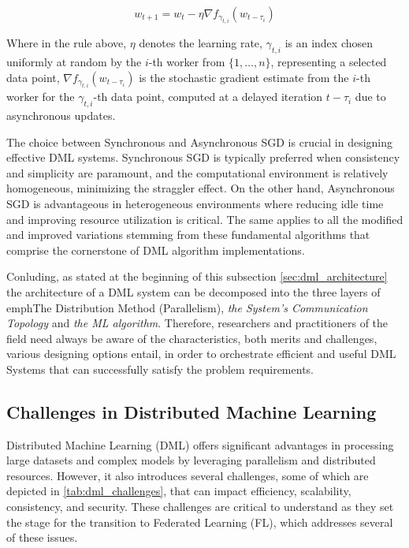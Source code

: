 \begin{equation}
    \label{eq:asgd}
    w_{t+1} = w_t - \eta \nabla f_{\gamma_{t,i}}(w_{t - \tau_{i}})
\end{equation}

Where in the rule above, \emph{$\eta$} denotes the learning rate, \(\gamma_{t,i}\) is an index chosen uniformly at random by the \(i\)-th worker
from \(\{1,\dots,n\}\), representing a selected data point, \(\nabla f_{\gamma_{t,i}}(w_{t - \tau_{i}})\) is the stochastic gradient estimate from the
\(i\)-th worker for the \(\gamma_{t,i}\)-th data point, computed at a delayed iteration \( t - \tau_{i} \) due to asynchronous updates.

The choice between Synchronous and Asynchronous SGD is crucial in designing effective DML systems. Synchronous SGD is typically preferred when
consistency and simplicity are paramount, and the computational environment is relatively homogeneous, minimizing the straggler effect.
On the other hand, Asynchronous SGD is advantageous in heterogeneous environments where reducing idle time and improving resource utilization
is critical. The same applies to all the modified and improved variations stemming from these fundamental algorithms that comprise the
cornerstone of DML algorithm implementations.

Conluding, as stated at the beginning of this subsection \cref{sec:dml_architecture} the architecture of a DML system can be decomposed into
the three layers of emph{The Distribution Method (Parallelism)}, \emph{the System's Communication Topology} and \emph{the ML algorithm}. Therefore,
researchers and practitioners of the field need always be aware of the characteristics, both merits and challenges, various designing options
entail, in order to orchestrate efficient and useful DML Systems that can successfully satisfy the problem requirements.

\subsection{Challenges in Distributed Machine Learning}
\label{sec:dml_challenges}
Distributed Machine Learning (DML) offers significant advantages in processing large datasets and complex models by leveraging parallelism and
distributed resources. However, it also introduces several challenges, some of which are depicted in \cref{tab:dml_challenges}, that can impact efficiency,
scalability, consistency, and security. These challenges are critical to understand as they set the stage for the transition to Federated
Learning (FL), which addresses several of these issues.

